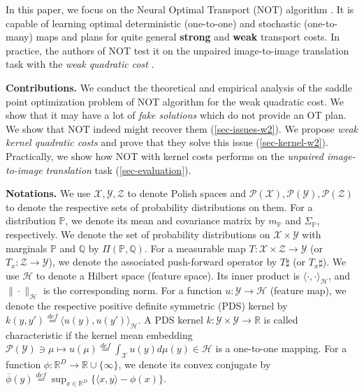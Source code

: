 \documentclass{article} %
\begin{document}
\vspace{-3mm}In this paper, we focus on the Neural Optimal Transport (NOT) algorithm \citep{korotin2023neural}. It is capable of learning optimal deterministic (one-to-one) and stochastic (one-to-many) maps and plans for quite general \textbf{strong} and \textbf{weak} \citep{gozlan2017kantorovich,gozlan2020mixture,backhoff2019existence} transport costs. In practice, the authors of NOT test it on the unpaired image-to-image translation task \citep[]{korotin2023neural} with the \textit{weak quadratic cost} \citep[]{alibert2019new}.

\vspace{-1mm}\textbf{Contributions.} We conduct the theoretical and empirical analysis of the saddle point optimization problem of NOT algorithm for the weak quadratic cost. We show that it may have a lot of \textit{fake solutions} which do not provide an OT plan. We show that NOT indeed might recover them (\wasyparagraph\ref{sec-issues-w2}). We propose \textit{weak kernel quadratic costs} and prove that they solve this issue (\wasyparagraph\ref{sec-kernel-w2}). Practically, we show how NOT with kernel costs performs on the \textit{unpaired image-to-image translation} task (\wasyparagraph\ref{sec-evaluation}).

\vspace{-1mm}\textbf{Notations.} We use $\mathcal{X},\mathcal{Y},\mathcal{Z}$ to denote Polish spaces and $\mathcal{P}(\mathcal{X}), \mathcal{P}(\mathcal{Y}),\mathcal{P}(\mathcal{Z})$ to denote the respective sets of probability distributions on them. For a distribution $\mathbb{P}$, we denote its mean and covariance matrix by $m_{\mathbb{P}}$ and $\Sigma_{\mathbb{P}}$, respectively. We denote the set of probability distributions on $\mathcal{X} \times \mathcal{Y}$ with marginals $\mathbb{P}$ and $\mathbb{Q}$ by $\Pi(\mathbb{P},\mathbb{Q})$.
For a measurable map $T:  \mathcal{X}\times\mathcal{Z}\rightarrow\mathcal{Y}$ (or $T_{x}:\mathcal{Z}\rightarrow\mathcal{Y}$), we denote the associated push-forward operator by $T\sharp$ (or $T_{x}\sharp$). We use $\mathcal{H}$ to denote a Hilbert space (feature space). Its inner product is $\langle\cdot,\cdot\rangle_{\mathcal{H}}$, and $\|\cdot\|_{\mathcal{H}}$ is the corresponding norm. For a function $u:\mathcal{Y}\rightarrow\mathcal{H}$ (feature map), we denote the respective positive definite symmetric (PDS) kernel by $k(y,y')\stackrel{def}{=}\langle u(y),u(y')\rangle_{\mathcal{H}}$. A PDS kernel $k:\mathcal{Y}\times\mathcal{Y}\rightarrow\mathbb{R}$ is called characteristic if the kernel mean embedding $\mathcal{P}(\mathcal{Y})\ni\mu\mapsto u(\mu)\stackrel{def}{=}\int_{\mathcal{X}}u(y)d\mu(y)\in\mathcal{H}$ is a one-to-one mapping. For a function $\phi: \mathbb{R}^D\rightarrow \mathbb{R}\cup\{\infty\}$, we denote its convex conjugate by $\overline{\phi}(y) \stackrel{def}{=} \sup_{x\in\mathbb{R}^{D}}\{\langle x,y \rangle- \phi\left(x\right)\}$. 
\end{document}
